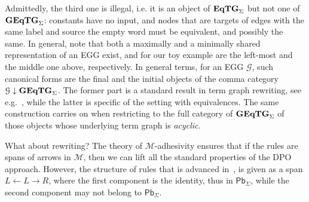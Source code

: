 \documentclass[a4paper,UKenglish,cleveref,pdftex,thm-restate,numberwithinsect]{lipics-v2021}
\newcommand{\pbc}{\mathsf{Pb}}
\newcommand{\catname}[1]{\textbf{\textup{#1}}}
\newcommand{\EqTGs}{\catname{EqTG}_{\Sigma}}
\newcommand{\GEqTGs}{\catname{GEqTG}_{\Sigma}}
\begin{document}
\begin{center}
\begin{tikzpicture}[baseline=(w)]
\end{tikzpicture}
\qquad
{}
\end{center}
%
Admittedly, the third one is illegal, i.e. it is an object of $\EqTGs$ but not one of $\GEqTGs$: constants have no input, 
and nodes that are targets of edges with the same label and source the empty word must be equivalent,
and possibly the same.
%
In general, note that both a maximally and a minimally shared representation of an EGG exist, and for our 
toy example are the left-most and the middle one above, respectively. In general terms,
for an EGG $\mathcal{G}$, such canonical forms are the final and the initial objects of the comma category 
$\mathcal{G}  \downarrow \GEqTGs$. 
The former part is a standard result in term graph rewriting, see e.g.~\cite{xxx}, while the latter is specific 
of the setting with equivalences.
%
The same construction carries on when restricting to the full category of $\GEqTGs$ of those objects whose 
underlying term graph is \emph{acyclic}.

What about rewriting? The theory of $\mathcal{M}$-adhesivity ensures that if the rules are spans of 
arrows in $\mathcal{M}$, then we can lift all the standard properties
of the DPO approach.
However, the structure of rules that is advanced in~\cite{DetlefsNS05},
is given as a span $L \leftarrow L \rightarrow R$, where the first component is the identity, thus in $\pbc_\Sigma$,
while the second component may not belong to $\pbc_\Sigma$. 
\end{document}
